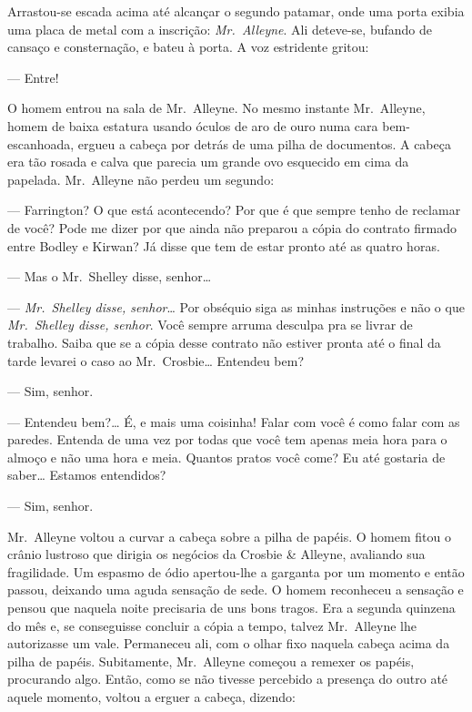 Arrastou-se escada acima até alcançar o segundo patamar, onde uma porta exibia
uma placa de metal com a inscrição: \textit{Mr.~Alleyne}.  Ali deteve-se,
bufando de cansaço e consternação, e bateu à porta.  A voz estridente gritou:

--- Entre!

O homem entrou na sala de Mr.~Alleyne.  No mesmo instante Mr.~Alleyne, homem de
baixa estatura usando óculos de aro de ouro numa cara bem-escanhoada, ergueu a
cabeça por detrás de uma pilha de documentos.  A cabeça era tão rosada e calva
que parecia um grande ovo esquecido em cima da papelada.  Mr.~Alleyne não
perdeu um segundo:

--- Farrington?  O que está acontecendo?  Por que é que sempre tenho de
reclamar de você?  Pode me dizer por que ainda não preparou a cópia do contrato
firmado entre Bodley e Kirwan?  Já disse que tem de estar pronto até as quatro
horas.

--- Mas o Mr.~Shelley disse, senhor\ldots{}

--- \textit{Mr.~Shelley disse, senhor}\ldots{}  Por obséquio siga as minhas
instruções e não o que \textit{Mr.~Shelley disse, senhor}.  Você sempre arruma
desculpa pra se livrar de trabalho.  Saiba que se a cópia desse contrato não
estiver pronta até o final da tarde levarei o caso ao Mr.~Crosbie\ldots{}
Entendeu bem?

--- Sim, senhor.

--- Entendeu bem?\ldots{} É, e mais uma coisinha!  Falar com você é como falar
com as paredes.  Entenda de uma vez por todas que você tem apenas meia hora
para o almoço e não uma hora e meia.  Quantos pratos você come?  Eu até
gostaria de saber\ldots{} Estamos entendidos?

--- Sim, senhor.

Mr.~Alleyne voltou a curvar a cabeça sobre a pilha de papéis.  O homem fitou o
crânio lustroso que dirigia os negócios da Crosbie \& Alleyne, avaliando sua
fragilidade.  Um espasmo de ódio apertou-lhe a garganta por um momento e então
passou, deixando uma aguda sensação de sede.  O homem reconheceu a sensação e
pensou que naquela noite precisaria de uns bons tragos.  Era a segunda quinzena
do mês e, se conseguisse concluir a cópia a tempo, talvez Mr.~Alleyne lhe
autorizasse um vale.  Permaneceu ali, com o olhar fixo naquela cabeça acima da
pilha de papéis.  Subitamente, Mr.~Alleyne começou a remexer os papéis,
procurando algo.  Então, como se não tivesse percebido a presença do outro até
aquele momento, voltou a erguer a cabeça, dizendo:

